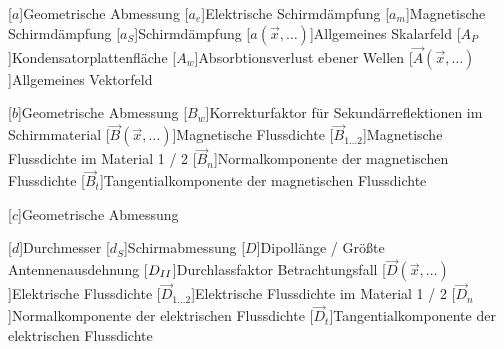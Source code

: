 \begin{acronym}[Platzhalterwort]

[$a$]{\acrounit{\meter}Geometrische Abmessung}
[$a_e$]{\acrounit{\Dezibel}Elektrische Schirmdämpfung}
[$a_m$]{\acrounit{\Dezibel}Magnetische Schirmdämpfung}
[$a_S$]{\acrounit{\Dezibel}Schirmdämpfung}
[$a(\vec x,\ldots)$]{\acrounit{-}Allgemeines Skalarfeld}
[$A_P$]{\acrounit{\square\meter}Kondensatorplattenfläche}
[$A_w$]{\acrounit{\Dezibel}Absorbtionsverlust ebener Wellen}
[$\vec A(\vec x,\ldots)$]{\acrounit{-}Allgemeines Vektorfeld}

[$b$]{\acrounit{\meter}Geometrische Abmessung}
[$B_w$]{\acrounit{\Dezibel}Korrekturfaktor für Sekundärreflektionen im Schirmmaterial}
[$\vec B(\vec x, \ldots)$]{\acrounit{\tesla}Magnetische Flussdichte}
[$\vec B_{1\ldots2}$]{\acrounit{\tesla}Magnetische Flussdichte im Material 1 / 2}
[$\vec B_n$]{\acrounit{\tesla}Normalkomponente der magnetischen Flussdichte}
[$\vec B_t$]{\acrounit{\tesla}Tangentialkomponente der magnetischen Flussdichte}

[$c$]{\acrounit{\meter}Geometrische Abmessung}

[$d$]{\acrounit{\meter}Durchmesser}
[$d_S$]{\acrounit{\meter}Schirmabmessung}
[$D$]{\acrounit{\meter}Dipollänge / Größte Antennenausdehnung}
[$D_{\uproman{2}}$]{Durchlassfaktor Betrachtungsfall }
[$\vec D(\vec x, \ldots)$]{\acrounit{\ampere\second\per\square\meter}Elektrische Flussdichte}
[$\vec D_{1\ldots2}$]{\acrounit{\ampere\second\per\square\meter}Elektrische Flussdichte im Material 1 / 2}
[$\vec D_n$]{\acrounit{\ampere\second\per\square\meter}Normalkomponente der elektrischen Flussdichte}
[$\vec D_t$]{\acrounit{\ampere\second\per\square\meter}Tangentialkomponente der elektrischen Flussdichte}



\end{acronym}
